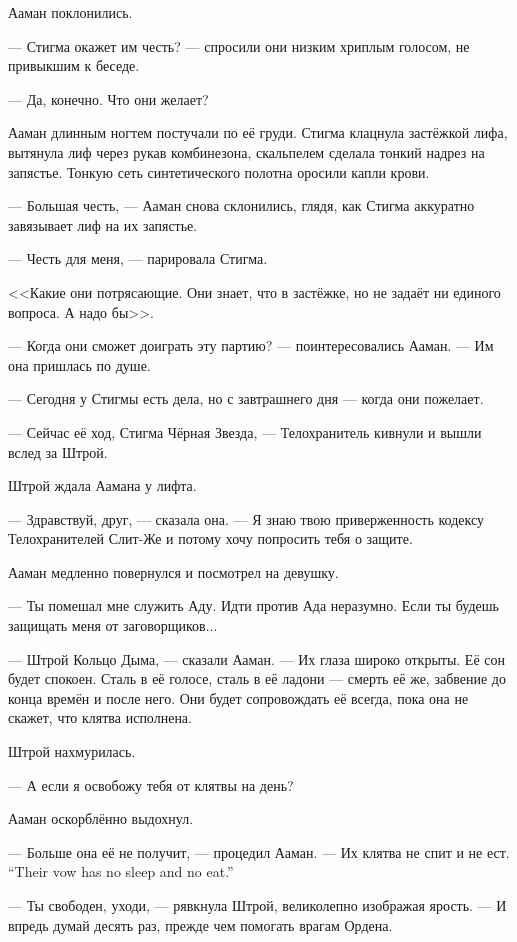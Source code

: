 Ааман поклонились.

--- Стигма окажет им честь? --- спросили они низким хриплым голосом, не привыкшим к беседе.

--- Да, конечно.
Что они желает?

Ааман длинным ногтем постучали по её груди.
Стигма клацнула застёжкой лифа, вытянула лиф через рукав комбинезона, скальпелем сделала тонкий надрез на запястье.
Тонкую сеть синтетического полотна оросили капли крови.

--- Большая честь, --- Ааман снова склонились, глядя, как Стигма аккуратно завязывает лиф на их запястье.

--- Честь для меня, --- парировала Стигма.

<<Какие они потрясающие.
Они знает, что в застёжке, но не задаёт ни единого вопроса.
А надо бы>>.

--- Когда они сможет доиграть эту партию? --- поинтересовались Ааман.
--- Им она пришлась по душе.

--- Сегодня у Стигмы есть дела, но с завтрашнего дня --- когда они пожелает.

--- Сейчас её ход, Стигма Чёрная Звезда, --- Телохранитель кивнули и вышли вслед за Штрой.

\asterism

Штрой ждала Аамана у лифта.

--- Здравствуй, друг, --- сказала она.
--- Я знаю твою приверженность кодексу Телохранителей Слит-Же и потому хочу попросить тебя о защите.

Ааман медленно повернулся и посмотрел на девушку.

--- Ты помешал мне служить Аду.
Идти против Ада неразумно.
Если ты будешь защищать меня от заговорщиков...

--- Штрой Кольцо Дыма, --- сказали Ааман.
--- Их глаза широко открыты.
Её сон будет спокоен.
Сталь в её голосе, сталь в её ладони --- смерть её же, забвение до конца времён и после него.
Они будет сопровождать её всегда, пока она не скажет, что клятва исполнена.

Штрой нахмурилась.

--- А если я освобожу тебя от клятвы на день?

Ааман оскорблённо выдохнул.

--- Больше она её не получит, --- процедил Ааман.
{--- Их клятва не спит и не ест.}
{``Their vow has no sleep and no eat.''}

--- Ты свободен, уходи, --- рявкнула Штрой, великолепно изображая ярость.
--- И впредь думай десять раз, прежде чем помогать врагам Ордена.

